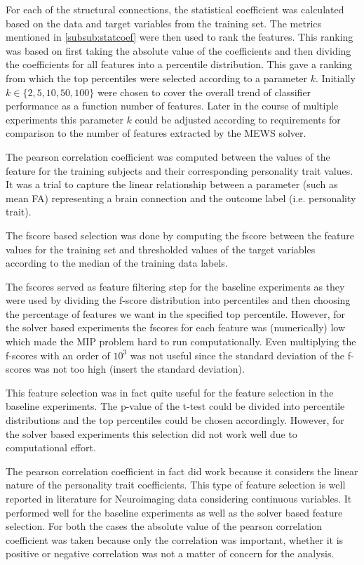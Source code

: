 \documentclass[msthesis.tex]{subfiles}
\begin{document}
For each of the structural connections, the statistical coefficient was calculated based on the data and target variables from the training set. The metrics mentioned in \autoref{subsub:statcoef} were then used to rank the features. This ranking was based on first taking the absolute value of the coefficients and then dividing the coefficients for all features into a percentile distribution. This gave a ranking from which the top percentiles were selected according to a parameter $k$. Initially $k \in \{2,5,10,50,100\}$ were chosen to cover the  overall trend of classifier performance as a function number of features. Later in the course of multiple experiments this parameter $k$ could be adjusted according to requirements for comparison to the number of features extracted by the MEWS solver.

\iffalse
The pearson correlation coefficient was computed between the values of the feature for the training subjects and their corresponding personality trait values. It was a trial to capture the linear relationship between a parameter (such as mean FA) representing a brain connection and the outcome label (i.e. personality trait).

The fscore based selection was done by computing the fscore between the feature values for the training set and thresholded values of the target variables according to the median of the training data labels. 

The fscores served as feature filtering step for the baseline experiments as they were used by dividing the f-score distribution into percentiles and then choosing the percentage of features we want in the specified top percentile. However, for the solver based experiments the fscores for each feature was (numerically) low which made the MIP problem hard to run computationally. Even multiplying the f-scores with an order of $10^3$ was not useful since the standard deviation of the f-scores was not too high (insert the standard deviation). 

This feature selection was in fact quite useful for the feature selection in the baseline experiments. The p-value of the t-test could be divided into percentile distributions and the top percentiles could be chosen accordingly. However, for the solver based experiments this selection did not work well due to computational effort. 

The pearson correlation coefficient in fact did work because it considers the linear nature of the personality trait coefficients. This type of feature selection is well reported in literature for Neuroimaging data considering continuous variables. It performed well for the baseline experiments as well as the solver based feature selection. For both the cases the absolute value of the pearson correlation coefficient was taken because only the correlation was important, whether it is positive or negative correlation was not a matter of concern for the analysis.
\end{document}
